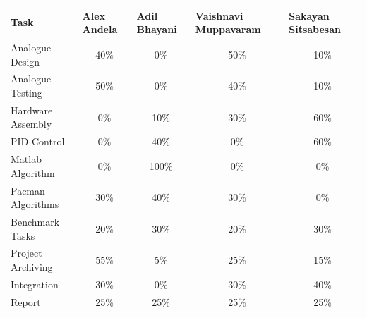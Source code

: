 \documentclass{article}
\begin{document}
\begin{table}[h]
\centering
\label{my-label}
\begin{tabular}{@{}l|cccc@{}}
\toprule
Task                          & \multicolumn{1}{l}{Alex Andela} & \multicolumn{1}{l}{Adil Bhayani} & \multicolumn{1}{l}{Vaishnavi Muppavaram} & \multicolumn{1}{l}{Sakayan Sitsabesan} \\ \midrule
Analogue Design               & 40\%                            & 0\%                              & 50\%                                     & 10\%                                   \\
Analogue Testing              & 50\%                            & 0\%                              & 40\%                                     & 10\%                                   \\
Hardware Assembly             & 0\%                             & 10\%                             & 30\%                                     & 60\%                                   \\
PID Control                   & 0\%                             & 40\%                             & 0\%                                      & 60\%                                   \\
Matlab Algorithm              & 0\%                             & 100\%                            & 0\%                                      & 0\%                                    \\
Pacman Algorithms             & 30\%                            & 40\%                             & 30\%                                     & 0\%                                    \\
Benchmark Tasks               & 20\%                            & 30\%                             & 20\%                                     & 30\%                                   \\
Project Archiving             & 55\%                            & 5\%                              & 25\%                                     & 15\%                                   \\
Integration & 30\%                            & 0\%                              & 30\%                                     & 40\%                                   			\\
Report				&25\%			&25\%				&25\%						&25\%			\\ \bottomrule
\end{tabular}
\end{table}
\end{document}
